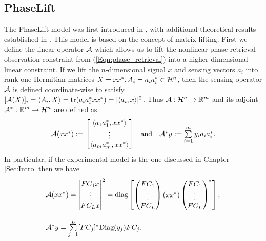 

\subsection{PhaseLift}

The PhaseLift model was first introduced in \cite{DBLP:journals/siamis/CandesESV13}, with additional theoretical results established in \cite{candes2013phaselift}.  This model is based on the concept of matrix lifting.  First we define the linear operator ${\mathcal A}$ which allows us to lift the nonlinear phase retrieval observation constraint from (\ref{Eqn:phase_retrieval}) into a higher-dimensional linear constraint.  If we lift the $n$-dimensional signal $x$ and sensing vectors $a_i$ into rank-one Hermitian matrices $X = xx^*, A_i = a_ia_i^* \in {\mathcal H}^n$, then the sensing operator ${\mathcal A}$ is defined coordinate-wise to satisfy $[{\mathcal A} (X)]_i = \langle A_i, X \rangle = \mathrm{tr}( a_i a_i^* xx^* )= | \langle a_i, x \rangle |^2$.  Thus ${\mathcal A}: {\mathcal H}^n \rightarrow {\mathbb R}^m$ and its adjoint ${\mathcal A}^* : {\mathbb R}^m \rightarrow {\mathcal H}^n$ are defined as
\begin{equation} 			\label{Eqn:A_definition}
\begin{array}{lcr}
{\mathcal A}(xx^*)
	:= \begin{bmatrix} \langle a_1 a_1^*, xx^* \rangle \\ \vdots \\ \langle a_m a_m^*, xx^* \rangle \end{bmatrix}
		
	& 	\text{and}
		&	{\mathcal A}^*y
			  := \sum\limits_{\substack{i = 1}}^{\substack{m}} y_ia_ia_i^*.
\end{array}
\end{equation}
In particular, if the experimental model is the one discussed in Chapter \ref{Sec:Intro} then we have
\begin{equation} 			\label{Eqn:A_definition_with_masks}
\begin{array}{l}
{\mathcal A}(xx^*)
		= \begin{vmatrix}
				FC_1x \\ \vdots \\ FC_Lx
			\end{vmatrix}^2
			= \textnormal{diag}\begin{bmatrix}
			\begin{pmatrix}
			FC_1 \\ \vdots \\ FC_L
			\end{pmatrix}
		 	(xx^*)
	 		\begin{pmatrix}
			FC_1 \\ \vdots \\ FC_L
		 	\end{pmatrix}^*
		\end{bmatrix},
									\\
									\\
{\mathcal A}^*y
			  =\sum\limits_{\substack{j=1}}^{\substack{L}}
					[FC_j]^* \textnormal{Diag}(y_j) F C_j.
\end{array}
\end{equation}






